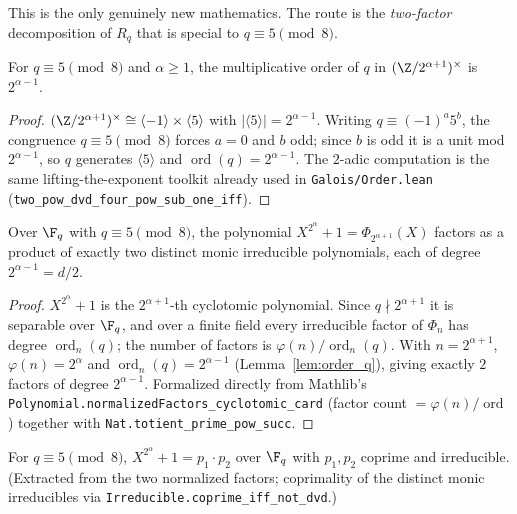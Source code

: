 This is the only genuinely new mathematics. The route is the \emph{two-factor} decomposition of
$R_q$ that is special to $q \equiv 5 \pmod 8$.

\begin{lemma}\label{lem:order_q}
\leanok
For $q \equiv 5 \pmod 8$ and $\alpha \ge 1$, the multiplicative order of $q$ in
$(\Z/2^{\alpha+1})^\times$ is $2^{\alpha-1}$.
\end{lemma}

\begin{proof}
\leanok
$(\Z/2^{\alpha+1})^\times \cong \langle -1\rangle \times \langle 5\rangle$ with
$|\langle 5\rangle| = 2^{\alpha-1}$. Writing $q \equiv (-1)^a 5^b$, the congruence $q \equiv 5
\pmod 8$ forces $a = 0$ and $b$ odd; since $b$ is odd it is a unit mod $2^{\alpha-1}$, so
$q$ generates $\langle 5\rangle$ and $\operatorname{ord}(q) = 2^{\alpha-1}$. The $2$-adic
computation is the same lifting-the-exponent toolkit already used in
\texttt{Galois/Order.lean} (\texttt{two\_pow\_dvd\_four\_pow\_sub\_one\_iff}).
\end{proof}

\begin{lemma}\label{lem:two_factors}
\leanok
{}
Over $\F_q$ with $q \equiv 5 \pmod 8$, the polynomial $X^{2^\alpha}+1 = \Phi_{2^{\alpha+1}}(X)$
factors as a product of exactly two distinct monic irreducible polynomials, each of degree
$2^{\alpha-1} = d/2$.
\end{lemma}

\begin{proof}
\leanok{}
$X^{2^\alpha}+1$ is the $2^{\alpha+1}$-th cyclotomic polynomial. Since $q \nmid 2^{\alpha+1}$ it is
separable over $\F_q$, and over a finite field every irreducible factor of $\Phi_n$ has degree
$\operatorname{ord}_n(q)$; the number of factors is $\varphi(n)/\operatorname{ord}_n(q)$. With
$n = 2^{\alpha+1}$, $\varphi(n) = 2^\alpha$ and $\operatorname{ord}_n(q) = 2^{\alpha-1}$
(Lemma~\ref{lem:order_q}), giving exactly $2$ factors of degree $2^{\alpha-1}$. Formalized directly
from Mathlib's \texttt{Polynomial.normalizedFactors\_cyclotomic\_card} (factor count $=
\varphi(n)/\operatorname{ord}$) together with \texttt{Nat.totient\_prime\_pow\_succ}.
\end{proof}

\begin{lemma}\label{lem:factorization}
\leanok
{}
For $q \equiv 5 \pmod 8$, $X^{2^\alpha}+1 = p_1 \cdot p_2$ over $\F_q$ with $p_1, p_2$ coprime and
irreducible. (Extracted from the two normalized factors; coprimality of the distinct monic
irreducibles via \texttt{Irreducible.coprime\_iff\_not\_dvd}.)
\end{lemma}

